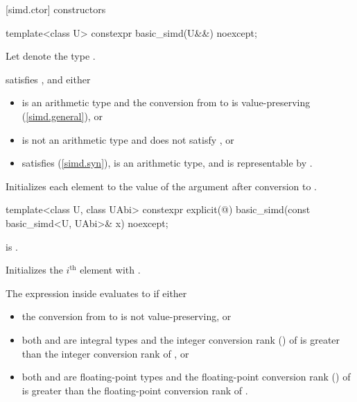 [simd.ctor]{ constructors}

\begin{itemdecl}
template<class U> constexpr basic_simd(U&&) noexcept;
\end{itemdecl}

\begin{itemdescr}
  \pnum Let  denote the type .

  \pnum\constraints
   satisfies , and either
  \begin{itemize}
    \item {} is an arithmetic type and the conversion from
       to  is value-preserving
      (\ref{simd.general}), or

    \item {} is not an arithmetic type and does not satisfy
      \tcode{\constexprwrapperlike}, or

    \item {} satisfies \tcode{\constexprwrapperlike} (\ref{simd.syn}),
       is an arithmetic type, and 
      is representable by .
  \end{itemize}

  \pnum\effects
  Initializes each element to the value of the argument after conversion to .
\end{itemdescr}

\begin{itemdecl}
template<class U, class UAbi>
  constexpr explicit(@\seebelow@) basic_simd(const basic_simd<U, UAbi>& x) noexcept;
\end{itemdecl}

\begin{itemdescr}
  \pnum\constraints
   is .

  \pnum\effects
  Initializes the $i^\text{th}$ element with  \foralli.

  \pnum\remarks
  The expression inside  evaluates to  if either
  \begin{itemize}
    \item the conversion from  to  is not
      value-preserving, or

    \item both  and  are integral types and the
      integer conversion rank () of  is greater than
      the integer conversion rank of , or

    \item both  and  are floating-point types and
      the floating-point conversion rank () of  is
      greater than the floating-point conversion rank of .
  \end{itemize}
\end{itemdescr}

